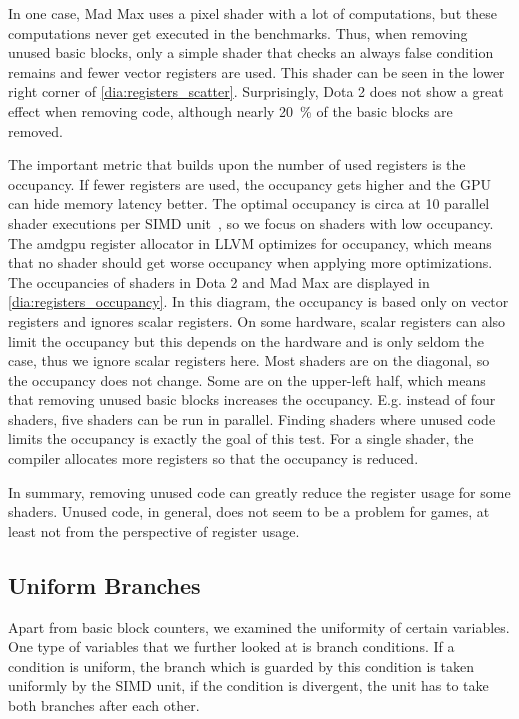 In one case, Mad Max uses a pixel shader with a lot of computations, but these computations never get executed in the benchmarks.
Thus, when removing unused basic blocks, only a simple shader that checks an always false condition remains and fewer vector registers are used.
This shader can be seen in the lower right corner of \cref{dia:registers_scatter}.
Surprisingly, Dota 2 does not show a great effect when removing code, although nearly \SI{20}{\percent} of the basic blocks are removed.

The important metric that builds upon the number of used registers is the occupancy.
If fewer registers are used, the occupancy gets higher and the GPU can hide memory latency better.
The optimal occupancy is circa at 10 parallel shader executions per SIMD unit~\cite{Aaltonen2017}, so we focus on shaders with low occupancy.
The amdgpu register allocator in LLVM optimizes for occupancy, which means that no shader should get worse occupancy when applying more optimizations.
The occupancies of shaders in Dota 2 and Mad Max are displayed in \cref{dia:registers_occupancy}.
In this diagram, the occupancy is based only on vector registers and ignores scalar registers.
On some hardware, scalar registers can also limit the occupancy but this depends on the hardware and is only seldom the case, thus we ignore scalar registers here.
Most shaders are on the diagonal, so the occupancy does not change.
Some are on the upper-left half, which means that removing unused basic blocks increases the occupancy.
E.g. instead of four shaders, five shaders can be run in parallel.
Finding shaders where unused code limits the occupancy is exactly the goal of this test.
For a single shader, the compiler allocates more registers so that the occupancy is reduced.


In summary, removing unused code can greatly reduce the register usage for some shaders.
Unused code, in general, does not seem to be a problem for games, at least not from the perspective of register usage.

\subsection{Uniform Branches}
\label{sub:eval_uniform_branches}
Apart from basic block counters, we examined the uniformity of certain variables.
One type of variables that we further looked at is branch conditions.
If a condition is uniform, the branch which is guarded by this condition is taken uniformly by the SIMD unit, if the condition is divergent, the unit has to take both branches after each other.

